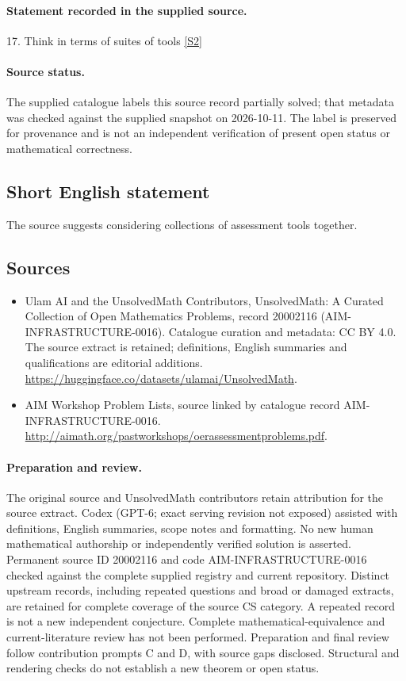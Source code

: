 \documentclass[11pt]{article}
\begin{document}
\paragraph{Statement recorded in the supplied source.}
17. Think in terms of suites of tools \href{http://aimath.org/pastworkshops/oerassessmentproblems.pdf}{[S2]}
\paragraph{Source status.}
The supplied catalogue labels this source record partially solved; that metadata was checked against the supplied snapshot on 2026-10-11. The label is preserved for provenance and is not an independent verification of present open status or mathematical correctness.
\subsection{Short English statement}
The source suggests considering collections of assessment tools together.
\subsection{Sources}
\begin{itemize}
\item[S1] Ulam AI and the UnsolvedMath Contributors, UnsolvedMath: A Curated Collection of Open Mathematics Problems, record 20002116 (AIM-INFRASTRUCTURE-0016). Catalogue curation and metadata: CC BY 4.0. The source extract is retained; definitions, English summaries and qualifications are editorial additions.
\url{https://huggingface.co/datasets/ulamai/UnsolvedMath}.
\item[S2] AIM Workshop Problem Lists, source linked by catalogue record AIM-INFRASTRUCTURE-0016.
\url{http://aimath.org/pastworkshops/oerassessmentproblems.pdf}.
\end{itemize}
\paragraph{Preparation and review.}
The original source and UnsolvedMath contributors retain attribution for the source extract. Codex (GPT-6; exact serving revision not exposed) assisted with definitions, English summaries, scope notes and formatting. No new human mathematical authorship or independently verified solution is asserted. Permanent source ID 20002116 and code AIM-INFRASTRUCTURE-0016 checked against the complete supplied registry and current repository. Distinct upstream records, including repeated questions and broad or damaged extracts, are retained for complete coverage of the source CS category. A repeated record is not a new independent conjecture. Complete mathematical-equivalence and current-literature review has not been performed. Preparation and final review follow contribution prompts C and D, with source gaps disclosed. Structural and rendering checks do not establish a new theorem or open status.
\label{end:20002116}
\end{document}
